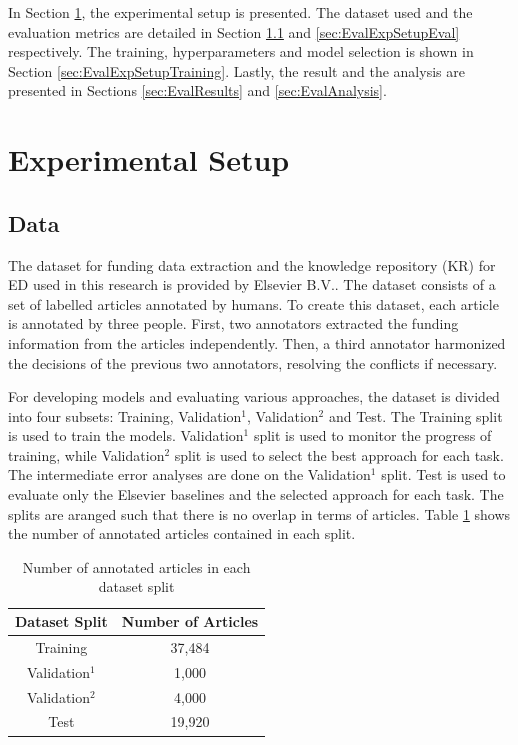 \documentclass{report}
\theoremstyle{definition}
\theoremstyle{remark}
\begin{document}
In Section \ref{sec:EvalExpSetup}, the experimental setup is presented. The dataset used and the evaluation metrics are detailed in Section \ref{sec:EvalExpSetupData} and \ref{sec:EvalExpSetupEval} respectively. The training, hyperparameters and model selection is shown in Section \ref{sec:EvalExpSetupTraining}. Lastly, the result and the analysis are presented in Sections \ref{sec:EvalResults} and \ref{sec:EvalAnalysis}.

\section{Experimental Setup}
\label{sec:EvalExpSetup}

\subsection{Data}
\label{sec:EvalExpSetupData}

The dataset for funding data extraction and the knowledge repository (KR) for ED used in this research is provided by Elsevier B.V.. The dataset consists of a set of labelled articles annotated by humans. To create this dataset, each article is annotated by three people. First, two annotators extracted the funding information from the articles independently. Then, a third annotator harmonized the decisions of the previous two annotators, resolving the conflicts if necessary. 

For developing models and evaluating various approaches, the dataset is divided into four subsets: Training, Validation$^{1}$, Validation$^{2}$ and Test. The Training split is used to train the models. Validation$^{1}$ split is used to monitor the progress of training, while Validation$^{2}$ split is used to select the best approach for each task. The intermediate error analyses are done on the Validation$^{1}$ split. Test is used to evaluate only the Elsevier baselines and the selected approach for each task. The splits are aranged such that there is no overlap in terms of articles. Table \ref{tab:goldstats} shows the number of annotated articles contained in each split.

\begin{table}[h!]
    \centering
    \begin{tabular}{c c}
    Dataset Split  & Number of Articles  \\
        \hline
    Training &  37,484\\
    Validation$^1$ & 1,000\\
    Validation$^2$ & 4,000\\
    Test & 19,920 \\
    \end{tabular}
    \caption{Number of annotated articles in each dataset split}
    \label{tab:goldstats}
\end{table}
\end{document}
